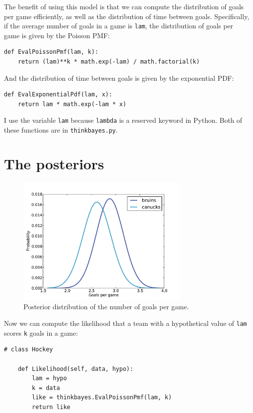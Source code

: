 \documentclass[12pt]{book}
\begin{document}
The benefit of using this model is that we can compute the distribution
of goals per game efficiently, as well as the distribution of time
between goals.  Specifically, if the average number of goals
in a game is {\tt lam}, the distribution of goals per game is
given by the Poisson PMF:

\begin{verbatim}
def EvalPoissonPmf(lam, k):
    return (lam)**k * math.exp(-lam) / math.factorial(k)
\end{verbatim}  

And the distribution of time between goals is given by the
exponential PDF:

\begin{verbatim}
def EvalExponentialPdf(lam, x):
    return lam * math.exp(-lam * x)
\end{verbatim}  

I use the variable
{\tt lam} because {\tt lambda} is a reserved keyword in Python.
Both of these functions are in \verb"thinkbayes.py".


\section{The posteriors}

\begin{figure}
\centerline{\includegraphics[height=2.5in]{figs/hockey1.pdf}}
\caption{Posterior distribution of the number of
goals per game.}
\label{fig.hockey1}
\end{figure}

Now we can compute the likelihood that a team with a hypothetical
value of {\tt lam} scores {\tt k} goals in a game:

\begin{verbatim}
# class Hockey

    def Likelihood(self, data, hypo):
        lam = hypo
        k = data
        like = thinkbayes.EvalPoissonPmf(lam, k)
        return like
\end{verbatim}
\end{document}
